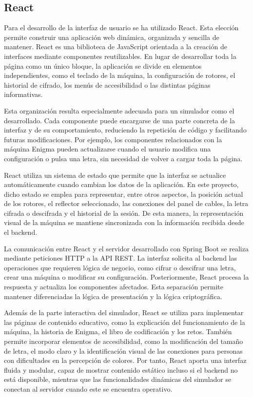 \subsection{React}

Para el desarrollo de la interfaz de usuario se ha utilizado React. Esta elección permite construir una aplicación web dinámica, organizada y sencilla de mantener. React es una biblioteca de JavaScript orientada a la creación de interfaces mediante componentes reutilizables. En lugar de desarrollar toda la página como un único bloque, la aplicación se divide en elementos independientes, como el teclado de la máquina, la configuración de rotores, el historial de cifrado, los menús de accesibilidad o las distintas páginas informativas.

Esta organización resulta especialmente adecuada para un simulador como el desarrollado. Cada componente puede encargarse de una parte concreta de la interfaz y de su comportamiento, reduciendo la repetición de código y facilitando futuras modificaciones. Por ejemplo, los componentes relacionados con la máquina Enigma pueden actualizarse cuando el usuario modifica una configuración o pulsa una letra, sin necesidad de volver a cargar toda la página.

React utiliza un sistema de estado que permite que la interfaz se actualice automáticamente cuando cambian los datos de la aplicación. En este proyecto, dicho estado se emplea para representar, entre otros aspectos, la posición actual de los rotores, el reflector seleccionado, las conexiones del panel de cables, la letra cifrada o descifrada y el historial de la sesión. De esta manera, la representación visual de la máquina se mantiene sincronizada con la información recibida desde el backend.

La comunicación entre React y el servidor desarrollado con Spring Boot se realiza mediante peticiones HTTP a la API REST. La interfaz solicita al backend las operaciones que requieren lógica de negocio, como cifrar o descifrar una letra, crear una máquina o modificar su configuración. Posteriormente, React procesa la respuesta y actualiza los componentes afectados. Esta separación permite mantener diferenciadas la lógica de presentación y la lógica criptográfica.

Además de la parte interactiva del simulador, React se utiliza para implementar las páginas de contenido educativo, como la explicación del funcionamiento de la máquina, la historia de Enigma, el libro de codificación y los retos. También permite incorporar elementos de accesibilidad, como la modificación del tamaño de letra, el modo claro y la identificación visual de las conexiones para personas con dificultades en la percepción de colores.
Por tanto, React aporta una interfaz fluida y modular, capaz de mostrar contenido estático incluso si el backend no está disponible, mientras que las funcionalidades dinámicas del simulador se conectan al servidor cuando este se encuentra operativo.

